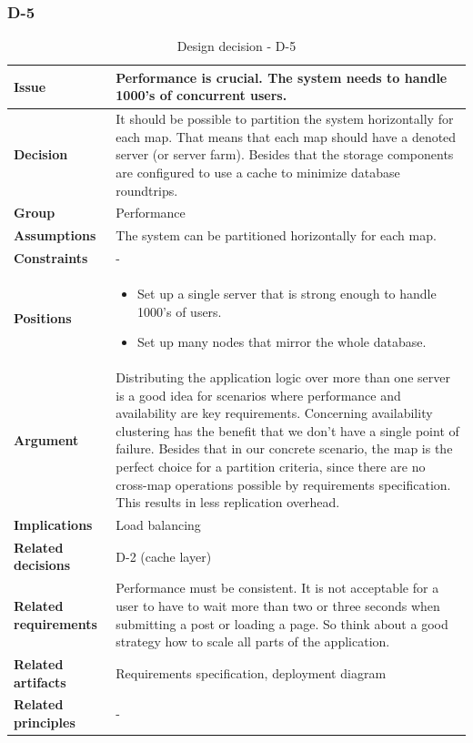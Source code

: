 \documentclass[11pt]{article}
\begin{document}
\newpage

\subsubsection{D-5}

\begin{table}[h] \small
	\begin{tabularx}{\textwidth}{ | l | X |}
    	\hline
	\cellcolor[gray]{0.9}
    	\textbf{Issue} & Performance is crucial. The system needs to handle 1000's of concurrent users. \\
	\hline
	\cellcolor[gray]{0.9}
	\textbf{Decision} & It should be possible to partition the system horizontally for each map. That means that each map should have a denoted server (or server farm). Besides that the storage components are configured to use a cache to minimize database roundtrips. \\
	\hline
	\cellcolor[gray]{0.9}
	\textbf{Group} & Performance \\
	\hline
	\cellcolor[gray]{0.9}
	\textbf{Assumptions} & The system can be partitioned horizontally for each map. \\
	\hline
	\cellcolor[gray]{0.9}
	\textbf{Constraints} & - \\
	\hline
	\cellcolor[gray]{0.9}
	\textbf{Positions} &
		\begin{itemize}
		\item Set up a single server that is strong enough to handle 1000's of users.
		\item Set up many nodes that mirror the whole database.
		\end{itemize}\\
	\hline
	\cellcolor[gray]{0.9}
	\textbf{Argument} & Distributing the application logic over more than one server is a good idea for scenarios where performance and availability are key requirements. Concerning availability clustering has the benefit that we don't have a single point of failure. Besides that in our concrete scenario, the map is the perfect choice for a partition criteria, since there are no cross-map operations possible by requirements specification. This results in less replication overhead. \\
	\hline
	\cellcolor[gray]{0.9}
	\textbf{Implications} & Load balancing \\
	\hline
	\cellcolor[gray]{0.9}
	\textbf{Related decisions} & D-2 (cache layer) \\
	\hline
	\cellcolor[gray]{0.9}
	\textbf{Related requirements} & Performance must be consistent. It is not acceptable for a user to have to wait more than two or three seconds when submitting a post or loading a page. So think about a good strategy how to scale all parts of the application.\\
	\hline
	\cellcolor[gray]{0.9}
	\textbf{Related artifacts} & Requirements specification, deployment diagram\\
	\hline
	\cellcolor[gray]{0.9}
	\textbf{Related principles} & -\\
	\hline
	\end{tabularx}
	\caption{Design decision - D-5}
	\label{dec:D5}
\end{table}
\end{document}
